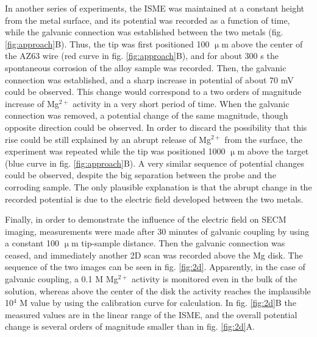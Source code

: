 In another series of experiments, the ISME was maintained at a constant height from the metal surface, and its potential was recorded as a function of time, while the galvanic connection was established between the two metals (fig. \ref{fig:approach}B). Thus, the tip was first positioned 100 $\upmu$m above the center of the AZ63 wire (red curve in fig. \ref{fig:approach}B), and for about 300 s the spontaneous corrosion of the alloy sample was recorded. Then, the galvanic connection was established, and a sharp increase in potential of about 70 mV could be observed. This change would correspond to a two orders of magnitude increase of Mg$^{2+}$ activity in a very short period of time. When the galvanic connection was removed, a potential change of the same magnitude, though opposite direction could be observed. In order to discard the possibility that this rise could be still explained by an abrupt release of Mg$^{2+}$ from the surface, the experiment was repeated while the tip was positioned 1000 $\upmu$m above the target (blue curve in fig. \ref{fig:approach}B). A very similar sequence of potential changes could be observed, despite the big separation between the probe and the corroding sample. The only plausible explanation is that the abrupt change in the recorded potential is due to the electric field developed between the two metals. 


Finally, in order to demonstrate the influence of the electric field on SECM imaging, measurements were made after 30 minutes of galvanic coupling by using a constant 100 $\upmu$m tip-sample distance.
Then the galvanic connection was ceased, and immediately another 2D scan was recorded above the Mg disk. The sequence of the two images can be seen in fig. \ref{fig:2d}. Apparently, in the case of galvanic coupling, a 0.1 M Mg$^{2+}$ activity is monitored even in the bulk of the solution, whereas above the center of the disk the activity reaches the implausible 10$^{4}$ M value by using the calibration curve for calculation.
In fig. \ref{fig:2d}B the measured values are in the linear range of the ISME, and the overall potential change is several orders of magnitude smaller than in fig. \ref{fig:2d}A.

